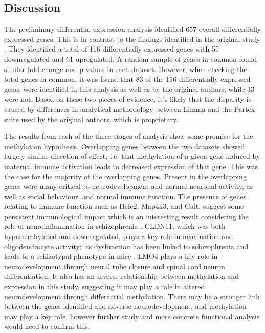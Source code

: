 \documentclass{bioinfo}
\begin{document}
\begin{discussion}
\section{Discussion}
The preliminary differential expression analysis identified 657 overall differentially expressed genes. This is in contrast to the findings identified in the original study \citep{richetto_genome-wide_2017}. They identified a total of 116 differentially expressed genes with 55 downregulated and 61 upregulated. A random sample of genes in common found similar fold change and p values in each dataset. However, when checking the total genes in common, it was found that 83 of the 116 differentially expressed genes were identified in this analysis as well as by the original authors, while 33 were not. Based on these two pieces of evidence, it's likely that the disparity is caused by differences in analytical methodology between Limma and the Partek suite used by the original authors, which is proprietary.

The results from each of the three stages of analysis show some promise for the methylation hypothesis. Overlapping genes between the two datasets showed largely similar direction of effect, i.e. that methylation of a given gene induced by maternal immune activation leads to decreased expression of that gene. This was the case for the majority of the overlapping genes. Present in the overlapping genes were many critical to neurodevelopment and normal neuronal activity, as well as social behaviour, and normal immune function. The presence of genes relating to immune function such as Hcfc2, Map4k3, and Galt, suggest some persistent immunological impact which is an interesting result considering the role of neuroinflammation in schizophrenia \citep{laskaris_microglial_2016}. CLDN11, which was both hypermethylated and downregulated, plays a key role in myelination and oligodendrocyte activity; its dysfunction has been linked to schizophrenia \citep{cassoli_disturbed_2015, tkachev_oligodendrocyte_2003, dracheva_myelin-associated_2006} and leads to a schizotypal phenotype in mice \citep{maheras_absence_2018}. LMO4 plays a key role in neurodevelopment through neural tube closure and spinal cord neuron differentiation. It also has an inverse relationship between methylation and expression in this study, suggesting it may play a role in altered neurodevelopment through differential methylation. There may be a stronger link between the genes identified and adverse neurodevelopment, and methylation may play a key role, however further study and more concrete functional analysis would need to confirm this.


\end{discussion}
\end{document}
